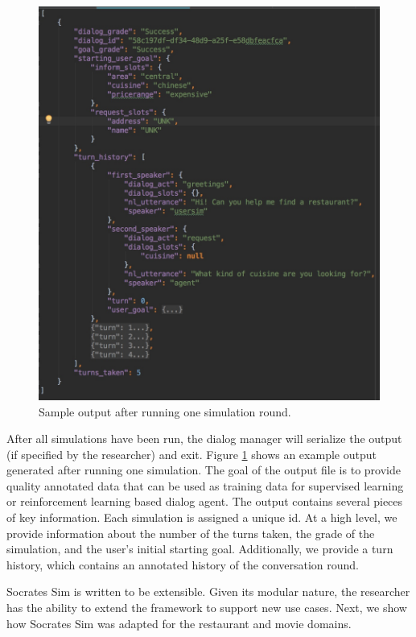 \begin{figure}[h!]
	\centering
	\includegraphics[scale=.17]{diagrams/sample_save_output.jpeg}
	\caption{ Sample output after running one simulation round. }
	\label{fig:sample_output}
\end{figure}

After all simulations have been run, the dialog manager will serialize the output (if specified by the researcher) and exit. Figure \ref{fig:sample_output} shows an example output generated after running one simulation. The goal of the output file is to provide quality annotated data that can be used as training data for supervised learning or reinforcement learning based dialog agent. The output contains several pieces of key information. Each simulation is assigned a unique id. At a high level, we provide information about the number of the turns taken, the grade of the simulation, and the user's initial starting goal. Additionally, we provide a turn history, which contains an annotated history of the conversation round. 

Socrates Sim is written to be extensible. Given its modular nature, the researcher has the ability to extend the framework to support new use cases. Next, we show how Socrates Sim was adapted for the restaurant and movie domains. 


